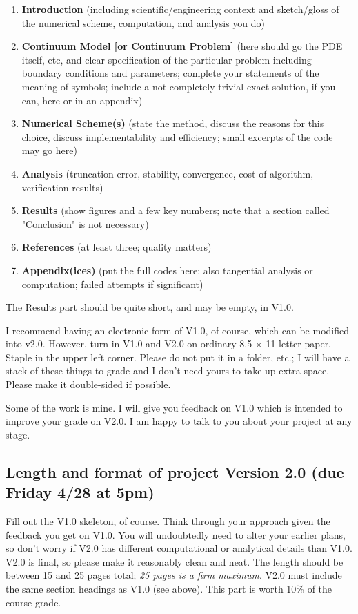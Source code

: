 \documentclass[11pt]{amsart}
\begin{document}
\renewcommand{\labelenumi}{\arabic{enumi}.}
\begin{enumerate}
\item \textbf{Introduction}  (including scientific/engineering context and sketch/gloss of the numerical scheme, computation, and analysis you do)
\item \textbf{Continuum Model [or Continuum Problem]}  (here should go the PDE itself, etc, and clear specification of the particular problem including boundary conditions and parameters; complete your statements of the meaning of symbols; include a not-completely-trivial exact solution, if you can, here or in an appendix)
\item \textbf{Numerical Scheme(s)}  (state the method, discuss the reasons for this choice, discuss implementability and efficiency; small excerpts of the code may go here)
\item \textbf{Analysis}  (truncation error, stability, convergence, cost of algorithm, verification results)
\item \textbf{Results}  (show figures and a few key numbers; note that a section called "Conclusion" is not necessary)
\item \textbf{References}  (at least three; quality matters)
\item \textbf{Appendix(ices)}  (put the full codes here; also tangential analysis or computation; failed attempts if significant)
\end{enumerate}

The Results part should be quite short, and may be empty, in V1.0.

I recommend having an electronic form of V1.0, of course, which can be modified into v2.0.  However, turn in V1.0 and V2.0 on ordinary 8.5 $\times$ 11 letter paper.  Staple in the upper left corner.  Please do not put it in a folder, etc.; I will have a stack of these things to grade and I don't need yours to take up extra space.  Please make it double-sided if possible.

Some of the work is mine.  I will give you feedback on V1.0 which is intended to improve your grade on V2.0.  I am happy to talk to you about your project at any stage.


\subsection*{Length and format of project Version 2.0 (due Friday 4/28 at 5pm)}  Fill out the V1.0 skeleton, of course.  Think through your approach given the feedback you get on V1.0.  You will undoubtedly need to alter your earlier plans, so don't worry if V2.0 has different computational or analytical details than V1.0.  V2.0 is final, so please make it reasonably clean and neat.  The length should be between 15 and 25 pages total; \emph{25 pages is a firm maximum}.  V2.0 must include the same section headings as V1.0 (see above).  This part is worth 10\% of the course grade.
\end{document}

